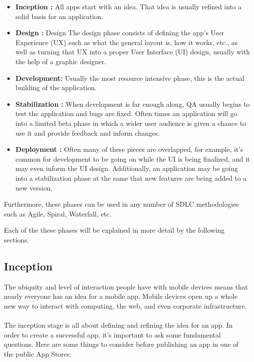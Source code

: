 \begin{itemize}


 \item \textbf{Inception :}  All apps start with an idea. That idea is usually refined into a solid basis for an application.
 \item \textbf{Design :} Design  The design phase consists of defining the app’s User Experience (UX) such as what the general layout is, how it works, etc., as well as turning that UX into a proper User Interface (UI) design, usually with the help of a graphic designer.
 \item \textbf{Development:} Usually the most resource intensive phase, this is the actual building of the application.
 \item \textbf{Stabilization :} When development is far enough along, QA usually begins to test the application and bugs are fixed. Often times an application will go into a limited beta phase in which a wider user audience is given a chance to use it and provide feedback and inform changes.
 \item \textbf{Deployment :}  Often many of these pieces are overlapped, for example, it’s common for development to be going on while the UI is being finalized, and it may even inform the UI design. Additionally, an application may be going into a stabilization phase at the same that new features are being added to a new version.

\end{itemize}

Furthermore, these phases can be used in any number of SDLC methodologies such as Agile, Spiral, Waterfall, etc.

Each of the these phases will be explained in more detail by the following sections.



\subsection{Inception}

The ubiquity and level of interaction people have with mobile devices means that nearly everyone has an idea for a mobile app. Mobile devices open up a whole new way to interact with computing, the web, and even corporate infrastructure.

\paragraph{}
The inception stage is all about defining and refining the idea for an app. In order to create a successful app, it’s important to ask some fundamental questions. Here are some things to consider before publishing an app in one of the public App Stores:

